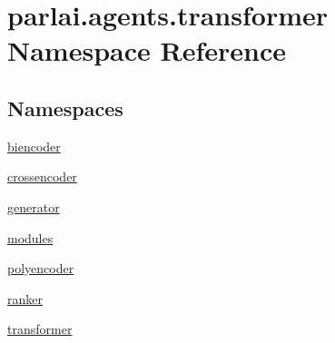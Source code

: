 \hypertarget{namespaceparlai_1_1agents_1_1transformer}{}\section{parlai.\+agents.\+transformer Namespace Reference}
\label{namespaceparlai_1_1agents_1_1transformer}
\subsection*{Namespaces}
\begin{DoxyCompactItemize}
\item 
 \hyperlink{namespaceparlai_1_1agents_1_1transformer_1_1biencoder}{biencoder}
\item 
 \hyperlink{namespaceparlai_1_1agents_1_1transformer_1_1crossencoder}{crossencoder}
\item 
 \hyperlink{namespaceparlai_1_1agents_1_1transformer_1_1generator}{generator}
\item 
 \hyperlink{namespaceparlai_1_1agents_1_1transformer_1_1modules}{modules}
\item 
 \hyperlink{namespaceparlai_1_1agents_1_1transformer_1_1polyencoder}{polyencoder}
\item 
 \hyperlink{namespaceparlai_1_1agents_1_1transformer_1_1ranker}{ranker}
\item 
 \hyperlink{namespaceparlai_1_1agents_1_1transformer_1_1transformer}{transformer}
\end{DoxyCompactItemize}
